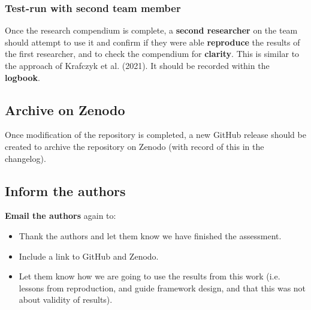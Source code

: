 \newpage
\subsubsection{Test-run with second team member}

Once the research compendium is complete, a \textbf{second researcher} on the team should attempt to use it and confirm if they were able \textbf{reproduce} the results of the first researcher, and to check the compendium for \textbf{clarity}. This is similar to the approach of Krafczyk et al. (2021).\autocite{krafczyk_learning_2021} It should be recorded within the \textbf{logbook}.

\vspace{0.5cm}
\subsection{Archive on Zenodo}

Once modification of the repository is completed, a new GitHub release should be created to archive the repository on Zenodo (with record of this in the changelog).

\vspace{0.5cm}
\subsection{Inform the authors}

\textbf{Email the authors} again to:
\begin{itemize}
    \item Thank the authors and let them know we have finished the assessment.
    \item Include a link to GitHub and Zenodo.
    \item Let them know how we are going to use the results from this work (i.e. lessons from reproduction, and guide framework design, and that this was not about validity of results).
\end{itemize}